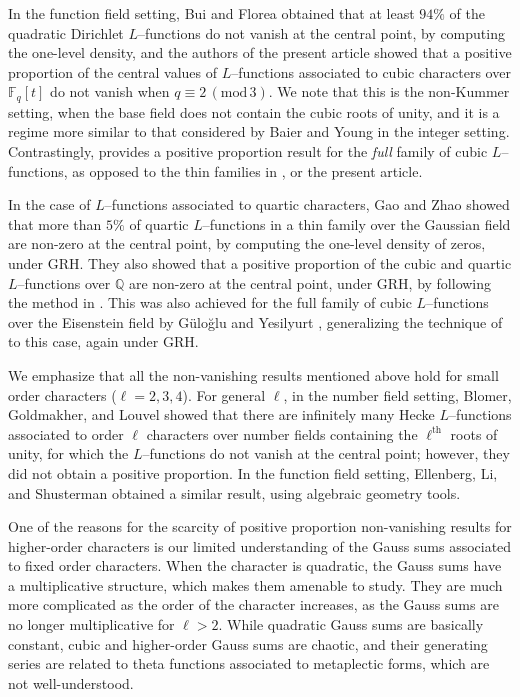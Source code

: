 \documentclass[12pt]{amsart}
\renewcommand{\pmod}[1]{\,(\mathrm{mod}\,#1)}
\begin{document}
In the function field setting, Bui and Florea \cite{Bui-Florea} obtained that at least $94\%$ of the quadratic Dirichlet $L$--functions do not vanish at the central point, by computing the one-level density, and the authors of the present article \cite{DFL2} showed that a positive proportion of the central values of $L$--functions associated to cubic characters over $\mathbb{F}_q[t]$ do not vanish when $q \equiv 2 \pmod3$. We note that this is the non-Kummer setting, when the base field does not contain the cubic roots of unity, and it is a regime more similar to that considered by Baier and Young \cite{BY} in the integer setting. Contrastingly, \cite{DFL2} provides a positive proportion result for the \textit{full} family of cubic $L$--functions, as opposed to the thin families in \cite{dg}, \cite{ddds} or the present article.

In the case of $L$--functions associated to quartic characters, Gao and Zhao \cite{gao_zhao} showed that more than $5\%$ of quartic $L$--functions in a thin family over the Gaussian field are non-zero at the central point, by computing the one-level density of zeros, under GRH. They also showed \cite{gao_zhao2} that a positive proportion of the cubic and quartic $L$--functions over $\mathbb{Q}$ are non-zero at the central point, under GRH, by following the method in \cite{DFL2}. This was also achieved for the full family of cubic $L$--functions over the Eisenstein field by G\"ulo\u{g}lu and Yesilyurt \cite{G-Y}, generalizing the  technique of  \cite{DFL2} to this case, again under GRH.

We emphasize that all the non-vanishing results mentioned above hold for small order characters ($\ell=2,3,4$). For general $\ell$, in the number field setting, Blomer, Goldmakher, and Louvel \cite{bgl} showed that there are infinitely many Hecke $L$--functions associated to order $\ell$ characters over number fields containing the $\ell^{\text{th}}$ roots of unity, for which the $L$--functions do not vanish at the central point; however, they did not obtain a positive proportion. In the function field setting, Ellenberg, Li, and Shusterman \cite{ELS} obtained a similar result, using algebraic geometry tools.

One of the reasons for the scarcity of positive proportion non-vanishing results for higher-order characters is our limited understanding of the Gauss sums associated to fixed order characters.
When the character is quadratic, the Gauss sums have a multiplicative structure, which makes them amenable to study. They are much more complicated as the order of the character increases, as the Gauss sums are no longer multiplicative for $\ell>2$.
While quadratic Gauss sums are basically constant, cubic and higher-order Gauss sums are chaotic, and their generating series are related to theta functions associated to metaplectic forms, which are not well-understood.
\end{document}
